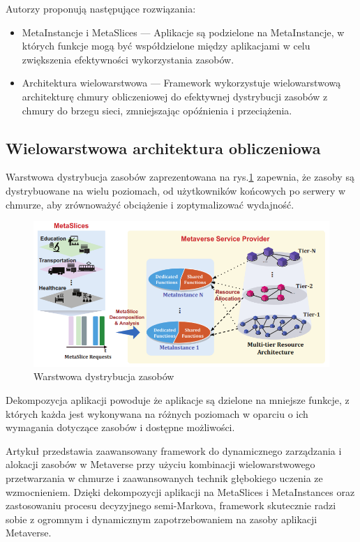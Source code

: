 Autorzy proponują następujące rozwiązania:
\begin{itemize}
    \item MetaInstancje i MetaSlices --- Aplikacje są podzielone na MetaInstancje, w których funkcje mogą być współdzielone między aplikacjami w celu zwiększenia efektywności wykorzystania zasobów.
    \item Architektura wielowarstwowa --- Framework wykorzystuje wielowarstwową architekturę chmury obliczeniowej do efektywnej dystrybucji zasobów z chmury do brzegu sieci, zmniejszając opóźnienia i przeciążenia.
\end{itemize}

\subsection{Wielowarstwowa architektura obliczeniowa}

Warstwowa dystrybucja zasobów zaprezentowana na rys.\ref{metaslicingMultiTierArch} zapewnia, że zasoby są dystrybuowane na wielu poziomach, od użytkowników końcowych po serwery w chmurze, aby zrównoważyć obciążenie i zoptymalizować wydajność.

\begin{figure}[!htbp]
    \centering
    \includegraphics[width=\textwidth]{images/existingArchitectres/dynamicResourcemetaslicingMultiTierArch.png}
    \caption{Warstwowa dystrybucja zasobów}
    \label{metaslicingMultiTierArch}
\end{figure}

Dekompozycja aplikacji powoduje że aplikacje są dzielone na mniejsze funkcje, z których każda jest wykonywana na różnych poziomach w oparciu o ich wymagania dotyczące zasobów i dostępne możliwości.

Artykuł przedstawia zaawansowany framework do dynamicznego zarządzania i alokacji zasobów w Metaverse przy użyciu kombinacji wielowarstwowego przetwarzania w chmurze i zaawansowanych technik głębokiego uczenia ze wzmocnieniem. Dzięki dekompozycji aplikacji na MetaSlices i MetaInstances oraz zastosowaniu procesu decyzyjnego semi-Markova, framework skutecznie radzi sobie z ogromnym i dynamicznym zapotrzebowaniem na zasoby aplikacji Metaverse.

